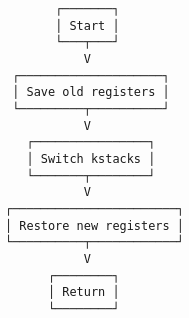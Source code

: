\documentclass[varwidth,crop]{standalone}
\begin{document}
\begin{verbatim}
       ┌───────┐
       │ Start │
       └───┬───┘
           V
 ┌────────────────────┐
 │ Save old registers │
 └─────────┬──────────┘
           V
   ┌────────────────┐
   │ Switch kstacks │
   └───────┬────────┘
           V
┌───────────────────────┐
│ Restore new registers │
└──────────┬────────────┘
           V
      ┌────────┐
      │ Return │
      └────────┘
\end{verbatim}
\end{document}

